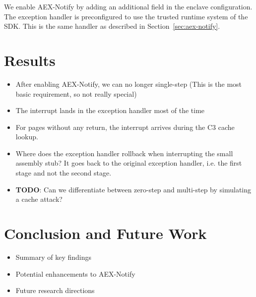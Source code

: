 \documentclass{llncs}
\begin{document}
We enable AEX-Notify by adding an additional field in the enclave configuration.
The exception handler is preconfigured to use the trusted runtime system of the SDK.
This is the same handler as described in Section~\ref{sec:aex-notify}.

\section{Results}

\begin{itemize}
  \item After enabling AEX-Notify, we can no longer single-step (This is the most basic requirement, so not really special)
  \item The interrupt lands in the exception handler most of the time
  \item For pages without any return, the interrupt arrives during the C3 cache lookup.
  \item Where does the exception handler rollback when interrupting the small assembly stub?
    It goes back to the original exception handler, i.e. the first stage and not the second stage.
  \item \textbf{TODO}: Can we differentiate between zero-step and multi-step by simulating a cache attack?
\end{itemize}

\section{Conclusion and Future Work}
\begin{itemize}
    \item Summary of key findings
    \item Potential enhancements to AEX-Notify
    \item Future research directions
\end{itemize}


%

\end{document}
